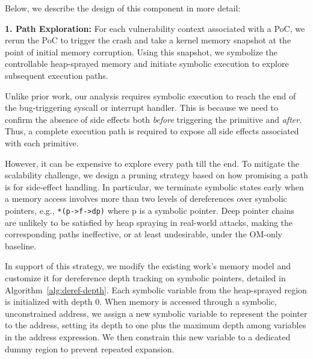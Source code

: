 Below, we describe the design of this component in more detail:

\noindent\textbf{1. Path Exploration:} For each vulnerability context associated with a PoC, we rerun the PoC to trigger the crash and take a kernel memory snapshot at the point of initial memory corruption. Using this snapshot, we symbolize the controllable heap-sprayed memory and initiate symbolic execution to explore subsequent execution paths. 

Unlike prior work, our analysis requires symbolic execution to reach the end of the bug-triggering syscall or interrupt handler. This is because we need to confirm the absence of side effects both \textit{before} triggering the primitive and \textit{after}. Thus, a complete execution path is required to expose all side effects associated with each primitive.

However, it can be expensive to explore every path till the end. To mitigate the scalability challenge, we design a pruning strategy based on how promising a path is for side-effect handling. In particular, we terminate symbolic states early when a memory access involves more than two levels of dereferences over symbolic pointers, e.g., \texttt{*(p->f->dp)} where p is a symbolic pointer. Deep pointer chains are unlikely to be satisfied by heap spraying in real-world attacks, making the corresponding paths ineffective, or at least undesirable, under the OM-only baseline. %


In support of this strategy, we modify the existing work's \cite{zou2022syzscope} memory model and customize it for dereference depth tracking on symbolic pointers, detailed in Algorithm~\ref{alg:deref-depth}. Each symbolic variable from the heap-sprayed region is initialized with depth 0. When memory is accessed through a symbolic, unconstrained address, we assign a new symbolic variable to represent the pointer to the address, setting its depth to one plus the maximum depth among variables in the address expression. We then constrain this new variable to a dedicated dummy region to prevent repeated expansion.


